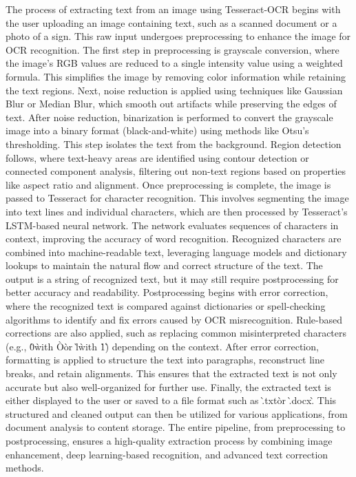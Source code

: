 \noindent
The process of extracting text from an image using Tesseract-OCR begins with the user uploading an image containing text, such as a scanned document or a photo of a sign. This raw input undergoes preprocessing to enhance the image for OCR recognition. The first step in preprocessing is grayscale conversion, where the image’s RGB values are reduced to a single intensity value using a weighted formula. This simplifies the image by removing color information while retaining the text regions. Next, noise reduction is applied using techniques like Gaussian Blur or Median Blur, which smooth out artifacts while preserving the edges of text. After noise reduction, binarization is performed to convert the grayscale image into a binary format (black-and-white) using methods like Otsu’s thresholding. This step isolates the text from the background. Region detection follows, where text-heavy areas are identified using contour detection or connected component analysis, filtering out non-text regions based on properties like aspect ratio and alignment. Once preprocessing is complete, the image is passed to Tesseract for character recognition. This involves segmenting the image into text lines and individual characters, which are then processed by Tesseract’s LSTM-based neural network. The network evaluates sequences of characters in context, improving the accuracy of word recognition. Recognized characters are combined into machine-readable text, leveraging language models and dictionary lookups to maintain the natural flow and correct structure of the text. The output is a string of recognized text, but it may still require postprocessing for better accuracy and readability. Postprocessing begins with error correction, where the recognized text is compared against dictionaries or spell-checking algorithms to identify and fix errors caused by OCR misrecognition. Rule-based corrections are also applied, such as replacing common misinterpreted characters (e.g., \`0\` with \`O\` or \`l\` with \`1\`) depending on the context. After error correction, formatting is applied to structure the text into paragraphs, reconstruct line breaks, and retain alignments. This ensures that the extracted text is not only accurate but also well-organized for further use. Finally, the extracted text is either displayed to the user or saved to a file format such as \`.txt\` or \`.docx\`. This structured and cleaned output can then be utilized for various applications, from document analysis to content storage. The entire pipeline, from preprocessing to postprocessing, ensures a high-quality extraction process by combining image enhancement, deep learning-based recognition, and advanced text correction methods.


